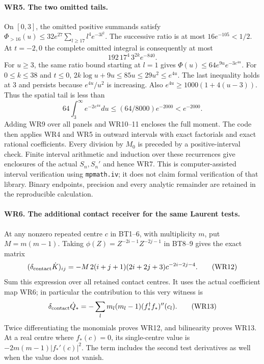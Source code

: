 \paragraph{WR5. The two omitted tails.}
On $[0,3]$, the omitted positive summands satisfy
$\Phi_{>16}(u)\le32e^{27}\sum_{l\ge17}l^4e^{-3l^2}$.
The successive ratio is at most $16e^{-105}<1/2$. At $t=-2,0$
the complete omitted integral is consequently at most
\[
 192\,17^4\,3^{2k}e^{-840}.
 \tag{WR10}
\]
For $u\ge3$, the same ratio bound starting at $l=1$ gives
$\Phi(u)\le64e^{9u}e^{-3e^{4u}}$.
For $0\le k\le38$ and $t\le0$,
$2k\log u+9u\le85u\le29u^2\le e^{4u}$.
The last inequality holds at $3$ and persists because
$e^{4u}/u^2$ is increasing. Also
$e^{4u}\ge1000(1+4(u-3))$. Thus the spatial tail is less than
\[
 64\int_3^\infty e^{-2e^{4u}}du
 \le(64/8000)e^{-2000}<e^{-2000}.
 \tag{WR11}
\]
Adding WR9 over all panels and WR10--11 encloses the full
moment. The code then applies WR4 and WR5 in outward intervals
with exact factorials and exact rational coefficients. Every
division by $M_0$ is preceded by a positive-interval check.
Finite interval arithmetic and induction over these recurrences
give enclosures of the actual $S_n,S_n'$ and hence WR7.
This is computer-assisted interval verification using
\texttt{mpmath.iv}; it does not claim formal verification of
that library. Binary endpoints, precision and every analytic
remainder are retained in the reproducible calculation.

\paragraph{WR6. The additional contact receiver for the same Laurent tests.}
At any nonzero repeated centre $c$ in BT1--6, with multiplicity
$m$, put $M=m(m-1)$. Taking
$\phi(Z)=Z^{-2i-1}Z^{-2j-1}$ in BT8--9 gives the exact matrix
\[
 (\delta_{\rm contact}\dot K)_{ij}
 =-M\,2(i+j+1)(2i+2j+3)c^{-2i-2j-4}.
 \tag{WR12}
\]
Sum this expression over all retained contact centres. It uses
the actual coefficient map WR6; in particular the contribution
to this very witness is
\[
 \delta_{\rm contact}\dot Q_*=-\sum_l m_l(m_l-1)
               (f_*^\dagger f_*)''(c_l).
 \tag{WR13}
\]
Twice differentiating the monomials proves WR12, and bilinearity
proves WR13. At a real centre where $f_*(c)=0$, its single-centre
value is $-2m(m-1)|f_*'(c)|^2$. The term includes the second
test derivatives as well when the value does not vanish.

